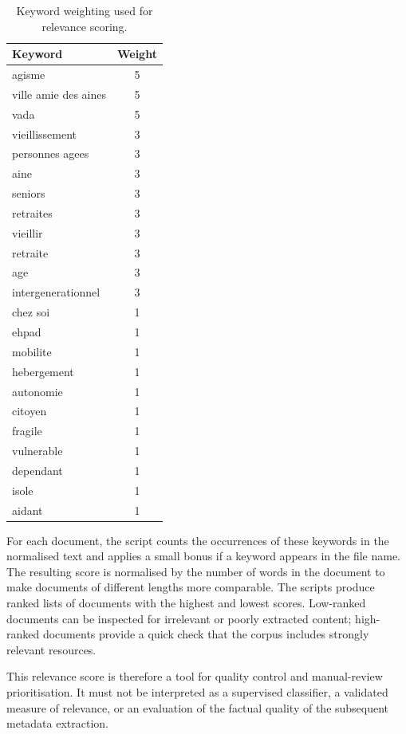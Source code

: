 \documentclass[
11pt,
english,
singlespacing,
headsepline,
]{MastersDoctoralThesis}
\begin{document}
\begin{table}[H]
\centering
\begin{tabular}{lc}
\toprule
Keyword & Weight \\
\midrule
agisme & 5 \\
ville amie des aines & 5 \\
vada & 5 \\
vieillissement & 3 \\
personnes agees & 3 \\
aine & 3 \\
seniors & 3 \\
retraites & 3 \\
vieillir & 3 \\
retraite & 3 \\
age & 3 \\
intergenerationnel & 3 \\
chez soi & 1 \\
ehpad & 1 \\
mobilite & 1 \\
hebergement & 1 \\
autonomie & 1 \\
citoyen & 1 \\
fragile & 1 \\
vulnerable & 1 \\
dependant & 1 \\
isole & 1 \\
aidant & 1 \\
\bottomrule
\end{tabular}
\caption{Keyword weighting used for relevance scoring.}
\label{tab:keyword-weights}
\end{table}

For each document, the script counts the occurrences of these keywords in the
normalised text and applies a small bonus if a keyword appears in the file name.
The resulting score is normalised by the number of words in the document to make
documents of different lengths more comparable. The scripts produce ranked lists
of documents with the highest and lowest scores. Low-ranked documents can be
inspected for irrelevant or poorly extracted content; high-ranked documents
provide a quick check that the corpus includes strongly relevant resources.

This relevance score is therefore a tool for quality control and manual-review
prioritisation. It must not be interpreted as a supervised classifier, a
validated measure of relevance, or an evaluation of the factual quality of the
subsequent metadata extraction.
\end{document}
